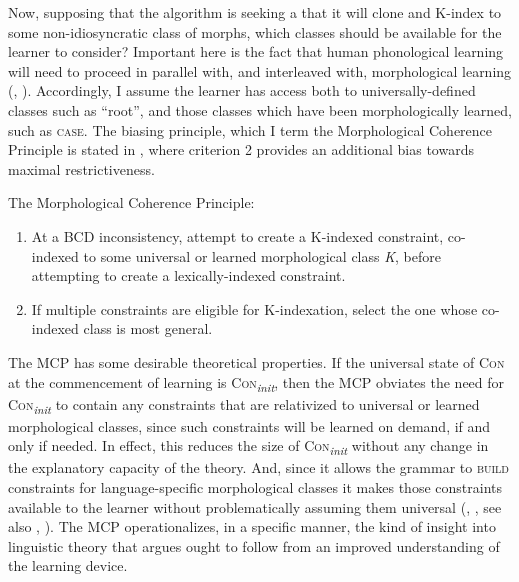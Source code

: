 \documentclass[output=paper,
modfonts
]{LSP/langsci}
\begin{document}
Now, supposing that the algorithm is seeking a  that it will clone and K-index to some non-idiosyncratic class of morphs, which classes should be available for the learner to consider? Important here is the fact that human phonological learning will need to proceed in parallel with, and interleaved with, morphological learning (\citealt{tesar2007}, \citealt[6]{merchant2008}). Accordingly, I assume the learner has access both to universally-defined classes such as ``root'', and those classes which have been morphologically learned, such as \textsc{ case}. The biasing principle, which I term the Morphological Coherence Principle is stated in , where criterion 2 provides an additional bias towards maximal restrictiveness.

\ea \label{ex:round:41} The Morphological Coherence Principle:
\begin{enumerate}
\item At a BCD inconsistency, attempt to create a K-indexed constraint, co-indexed to some universal or learned morphological class \textit{K}, before attempting to create a lexically-indexed constraint.
\item If multiple constraints are eligible for K-indexation, select the one whose co-indexed class is most general.
\end{enumerate}
\z

The MCP has some desirable theoretical properties. If the universal state of \textsc{Con} at the commencement of learning is \textsc{Con}\textit{\textsubscript{init}}, then the MCP obviates the need for \textsc{Con}\textit{\textsubscript{init}} to contain any constraints that are relativized to universal or learned morphological classes, since such constraints will be learned on demand, if and only if needed. In effect, this reduces the size of \textsc{Con}\textit{\textsubscript{init}} without any change in the explanatory capacity of the theory. And, since it allows the grammar to \textsc{build} constraints for language-specific morphological classes it makes those constraints available to the learner without problematically assuming them universal (\citealt{russell1995}, \citealt{hammond2000}, see also \citealt{smith2004}, \citealt{flack2007r}). The MCP operationalizes, in a specific manner, the kind of insight into linguistic theory that \citet{anderson2008} argues ought to follow from an improved understanding of the learning device. 
\end{document}
